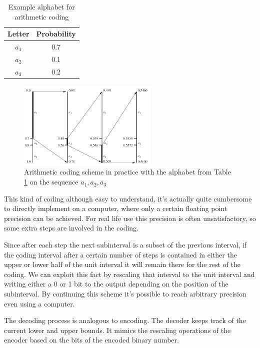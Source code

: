 \documentclass{diploma_style}
\begin{document}
\begin{table}
\caption{Example alphabet for arithmetic coding}
\centering
\begin{tabular}{cc}
\toprule
Letter & Probability \\
\midrule
$a_1$ & 0.7 \\
$a_2$ & 0.1 \\
$a_3$ & 0.2 \\
\bottomrule
\end{tabular}
\label{tab:arithmetic}
\end{table}

\begin{figure}
\centering
\includegraphics[width=0.6\textwidth]{figures/3_compression/arithmetic}
\caption{Arithmetic coding scheme in practice with the alphabet from Table \ref{tab:arithmetic} on the sequence $a_1,a_2,a_3$}
\label{fig:arithmetic}
\end{figure}

This kind of coding although easy to understand, it's actually quite cumbersome to directly implement on a computer, where only a certain floating point precision can be achieved. For real life use this precision is often unsatisfactory, so some extra steps are involved in the coding.

Since after each step the next subinterval is a subset of the previous interval, if the coding interval after a certain number of steps is contained in either the upper or lower half of the unit interval it will remain there for the rest of the coding. We can exploit this fact by rescaling that interval to the unit interval and writing either a 0 or 1 bit to the output depending on the position of the subinterval. By continuing this scheme it's possible to reach arbitrary precision even using a computer.

The decoding process is analogous to encoding. The decoder keeps track of the
current lower and upper bounds. It mimics the rescaling operations of the encoder
based on the bits of the encoded binary number.
\end{document}
